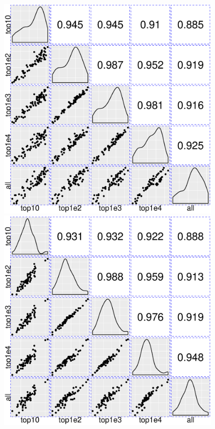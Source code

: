 \documentclass[letterpaper,12pt]{article}
\begin{document}
\begin{figure}[h!]
	\begin{center}
		\includegraphics[scale=0.34]{Figures/norm1.eps}
		\includegraphics[scale=0.34]{Figures/norm2.eps}

\end{center}
\end{figure}
\end{document}
